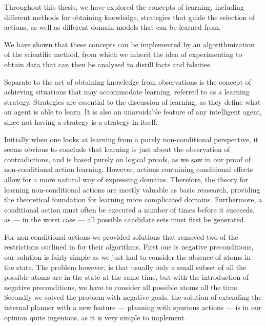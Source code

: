 \documentclass[Master.tex]{subfiles}
\begin{document}
Throughout this thesis, we have explored the concepts of learning, including different methods for obtaining knowledge, strategies that guide the selection of actions, as well as different domain models that can be learned from.

We have shown that these concepts can be implemented by an algorithmization of the scientific method, from which we inherit the idea of experimenting to obtain data that can then be analysed to distill facts and falsities.

	Separate to the act of obtaining knowledge from observations is the concept of achieving situations that may accommodate learning, referred to as a learning strategy.
	Strategies are essential to the discussion of learning, as they define what an agent is able to learn.
	It is also an unavoidable feature of any intelligent agent, since not having a strategy is a strategy in itself. 


	Initially when one looks at learning from a purely non-conditional perspective, 
	it seems obvious to conclude that learning is just about the observation of contradictions,
	and is based purely on logical proofs, as we saw in our proof of non-conditional action learning.
    However, actions containing conditional effects allow for a more natural way of expressing domains. Therefore, the theory for learning non-conditional actions are mostly valuable as basic reasearch, providing the theoretical foundation for learning more complicated domains.
	Furthermore, a conditional action must often be executed a number of times before it succeeds, as --- in the worst case --- all possible candidate sets must first be generated.
	
	For non-conditional actions we provided solutions that removed two of the restrictions outlined in \cite{Walsh2008} for their algorithms.
	First one is negative preconditions, our solution is fairly simple as we just had to consider the absence of atoms in the state.
	The problem however, is that usually only a small subset of all the possible atoms are in the state at the same time, 
	but with the introduction of negative preconditions, we have to consider all possible atoms all the time.
	Secondly we solved the problem with negative goals, the solution of extending the internal planner with a new feature --- planning with spurious actions --- is in our opinion quite ingenious, as it is very simple to implement. 
	
\end{document}

